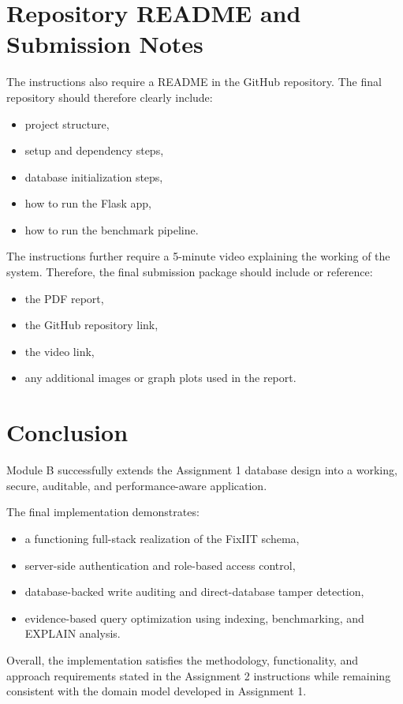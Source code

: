 \documentclass[12pt,a4paper]{article}
\begin{document}
\section{Repository README and Submission Notes}
The instructions also require a README in the GitHub repository. The final repository should therefore clearly include:
\begin{itemize}[leftmargin=1.5em]
    \item project structure,
    \item setup and dependency steps,
    \item database initialization steps,
    \item how to run the Flask app,
    \item how to run the benchmark pipeline.
\end{itemize}

The instructions further require a 5-minute video explaining the working of the system. Therefore, the final submission package should include or reference:
\begin{itemize}[leftmargin=1.5em]
    \item the PDF report,
    \item the GitHub repository link,
    \item the video link,
    \item any additional images or graph plots used in the report.
\end{itemize}

\section{Conclusion}
Module B successfully extends the Assignment 1 database design into a working, secure, auditable, and performance-aware application.

The final implementation demonstrates:
\begin{itemize}[leftmargin=1.5em]
    \item a functioning full-stack realization of the FixIIT schema,
    \item server-side authentication and role-based access control,
    \item database-backed write auditing and direct-database tamper detection,
    \item evidence-based query optimization using indexing, benchmarking, and EXPLAIN analysis.
\end{itemize}

Overall, the implementation satisfies the methodology, functionality, and approach requirements stated in the Assignment 2 instructions while remaining consistent with the domain model developed in Assignment 1.
\end{document}
